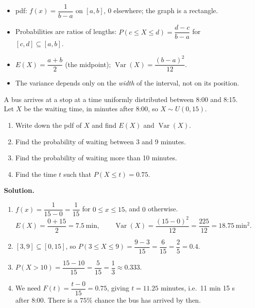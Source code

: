 \documentclass[11pt]{article}
\newcounter{popsec}
\newcounter{popsub}
\newcommand{\courssub}[1]{%
  \stepcounter{popsub}%
  \par\vspace{9pt}\noindent{\popxbold\fontsize{11.5}{13}\selectfont\color{popink}{\color{poporange}\thepopsec.\thepopsub}\hspace{6pt}#1}\par\nopagebreak\vspace{4pt}
}
\begin{document}
\begin{aretenir}
\begin{itemize}
\item pdf: $f(x)=\dfrac{1}{b-a}$ on $[a,b]$, $0$ elsewhere; the graph is a rectangle.
\item Probabilities are ratios of lengths: $P(c\le X\le d)=\dfrac{d-c}{b-a}$ for $[c,d]\subseteq[a,b]$.
\item $E(X)=\dfrac{a+b}{2}$ (the midpoint); $\operatorname{Var}(X)=\dfrac{(b-a)^2}{12}$.
\item The variance depends only on the \emph{width} of the interval, not on its position.
\end{itemize}
\end{aretenir}

\courssub{Worked Examples}

\begin{exoresolu}
A bus arrives at a stop at a time uniformly distributed between 8:00 and 8:15. Let $X$ be the waiting time, in minutes after 8:00, so $X\sim U(0,15)$.
\begin{enumerate}
\item Write down the pdf of $X$ and find $E(X)$ and $\operatorname{Var}(X)$.
\item Find the probability of waiting between 3 and 9 minutes.
\item Find the probability of waiting more than 10 minutes.
\item Find the time $t$ such that $P(X\le t)=0.75$.
\end{enumerate}
\tcblower
\textbf{Solution.}
\begin{enumerate}
\item $f(x)=\dfrac{1}{15-0}=\dfrac{1}{15}$ for $0\le x\le 15$, and $0$ otherwise.
\[
E(X)=\frac{0+15}{2}=7.5\ \text{min}, \qquad \operatorname{Var}(X)=\frac{(15-0)^2}{12}=\frac{225}{12}=18.75\ \text{min}^2.
\]
\item $[3,9]\subseteq[0,15]$, so $P(3\le X\le 9)=\dfrac{9-3}{15}=\dfrac{6}{15}=\dfrac{2}{5}=0.4$.
\item $P(X>10)=\dfrac{15-10}{15}=\dfrac{5}{15}=\dfrac{1}{3}\approx 0.333$.
\item We need $F(t)=\dfrac{t-0}{15}=0.75$, giving $t=11.25$ minutes, i.e.\ 11 min 15 s after 8:00. There is a $75\%$ chance the bus has arrived by then.
\end{enumerate}
\end{exoresolu}
\end{document}
